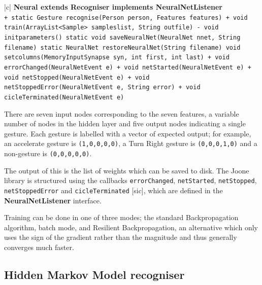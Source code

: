 \documentclass[12pt,a4,notitlepage]{report}
\renewcommand{\_}{\texttt{\symbol{95}}}
\newcommand{\<}{\texttt{\symbol{60}}}
\renewcommand{\>}{\texttt{\symbol{62}}}
\newcommand{\class}[1]{\textbf{#1}}
\newcommand{\variable}[1]{\texttt{#1}}
\begin{document}
\begin{tabular}{|c|} \hline 
\class{Neural extends Recogniser implements NeuralNetListener} \\ \hline
{}
{ \variable{+ static Gesture recognise(Person person, Features features) \newline
+ void train(ArrayList<Sample> sampleslist, String out\_file) \newline
- void init\_parameters() \newline
static void saveNeuralNet(NeuralNet nnet, String filename) \newline
static NeuralNet restoreNeuralNet(String filename) \newline
void set\_columns(MemoryInputSynapse syn, int first, int last) \newline
+ void errorChanged(NeuralNetEvent e) \newline
+ void netStarted(NeuralNetEvent e) \newline
+ void netStopped(NeuralNetEvent e) \newline
+ void netStoppedError(NeuralNetEvent e, String error) \newline
+ void cicleTerminated(NeuralNetEvent e)
} } \\ \hline
\end{tabular}

There are seven input nodes corresponding to the seven features, a variable number of nodes in the hidden layer and five output nodes indicating a single gesture. Each gesture is labelled with a vector of expected output; for example, an accelerate gesture is \variable{(1,0,0,0,0)}, a Turn Right gesture is \variable{(0,0,0,1,0)} and a non-gesture is \variable{(0,0,0,0,0)}.

The output of this is the list of weights which can be saved to disk. The Joone library is structured using the callbacks \variable{errorChanged}, \variable{netStarted}, \variable{netStopped}, \variable{netStoppedError} and \variable{cicleTerminated} [sic], which are defined in the \class{NeuralNetListener} interface.

Training can be done in one of three modes; the standard Backpropagation algorithm, batch mode, and Resilient Backpropagation, an alternative which only uses the sign of the gradient rather than the magnitude and thus generally converges much faster.

\subsection{Hidden Markov Model recogniser}
\end{document}
